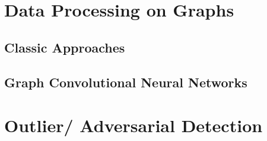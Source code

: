 \section{Data Processing on Graphs}

	\subsection{Classic Approaches}
	
	\subsection{Graph Convolutional Neural Networks}

\section{Outlier/ Adversarial Detection}